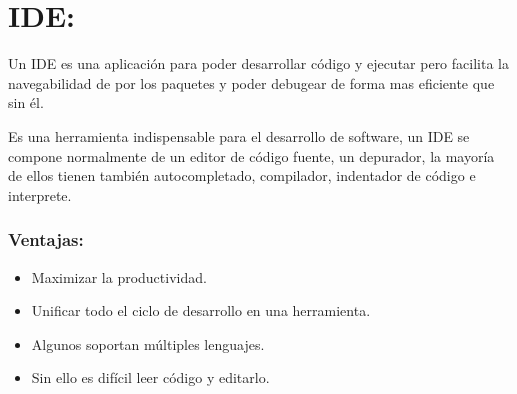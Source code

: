 \begin{table}[]
\centering
\caption{Tabla comparativa de herramientas}
\label{tb:1}
\end{table}
\section{IDE:}
Un IDE es una aplicación para poder desarrollar código y ejecutar pero facilita la navegabilidad de por los paquetes y poder debugear de forma mas eficiente que sin él.

Es una herramienta indispensable para el desarrollo de software, un IDE se compone normalmente de un editor de código fuente, un depurador, la mayoría de ellos tienen también autocompletado, compilador, indentador de código e interprete.

\subsubsection{Ventajas:}
\begin{itemize}
	\item Maximizar la productividad.
	\item Unificar todo el ciclo de desarrollo en una herramienta.
	\item Algunos soportan múltiples lenguajes. 
	\item Sin ello es difícil leer código y editarlo.
\end{itemize}

